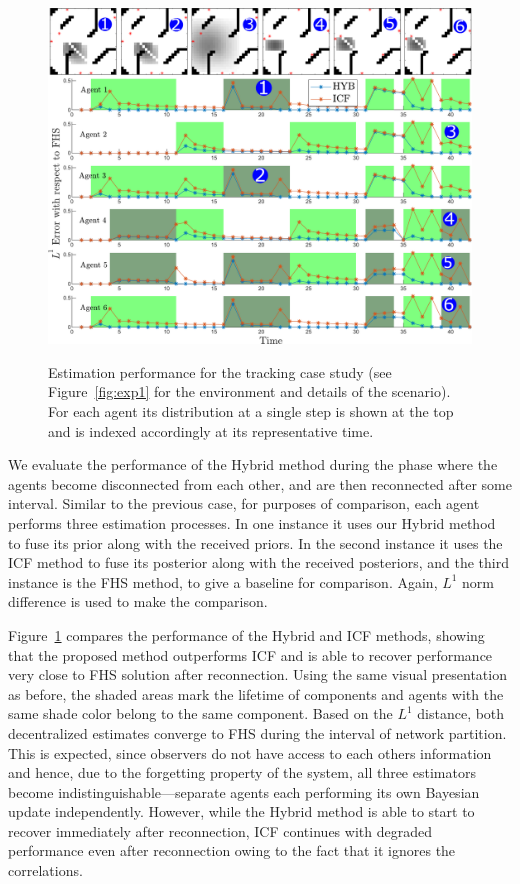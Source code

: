 \documentclass[journal]{IEEEtran}
\theoremstyle{remark}
\theoremstyle{definition}
\begin{document}
\begin{figure}[t]
\centering
{\includegraphics[width=.95\linewidth]{./CaseB_Chessboard_2.pdf}}
\caption{Estimation performance for the tracking case study (see
Figure~\ref{fig:exp1} for the environment and details of the scenario).
For each
agent its distribution at a single step is shown at the top and is indexed
accordingly at its representative time.}
\label{fig:exp2}
\end{figure} 

We evaluate the performance of the Hybrid method during the phase where the
agents become disconnected from each other, and are then reconnected after some
interval. Similar to the previous case, for purposes of comparison, each agent
performs three estimation processes. In one instance it uses our Hybrid method
to fuse its prior along with the received priors. In the second instance it
uses the ICF method to fuse its posterior along with the received posteriors,
and the third instance is the FHS method, to give a baseline for comparison.
Again, $L^1$ norm difference is used to make the comparison. 

Figure~\ref{fig:exp2} compares the performance of the Hybrid and ICF methods,
showing that the proposed method outperforms ICF and is able to recover
performance very close to FHS solution after reconnection. Using the same
visual presentation as before, the shaded areas mark the lifetime of
components and agents with the same shade color belong to the same component.
Based on the $L^1$ distance, both decentralized estimates converge to FHS
during the interval of network partition. This is expected, since observers do
not have access to each others information and hence, due to the forgetting
property of the system, all three estimators become
indistinguishable---separate agents each performing its own Bayesian update
independently. However, while the Hybrid method is able to start to recover
immediately after reconnection, ICF continues with degraded performance even
after reconnection owing to the fact that it ignores the correlations. 
\end{document}
